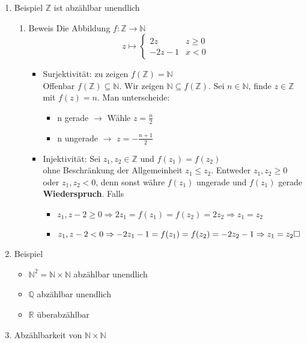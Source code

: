 \documentclass[11pt]{article}
\begin{document}
\begin{enumerate}
\item Beispiel
\label{sec-2-5-1-1}
$\mathbb{Z}$ ist abzählbar unendlich
\begin{enumerate}
\item Beweis
\label{sec-2-5-1-1-1}
Die Abbildung $f:\mathbb{Z}\to\mathbb{N}$
\[z\mapsto \begin{cases} 2z & z\geq 0\\ -2z - 1 & x < 0\end{cases}\]
\begin{itemize}
\item Surjektivität: zu zeigen $f(\mathbb{Z}) = \mathbb{N}$ \\
           Offenbar $f(\mathbb{Z}) \subseteq \mathbb{N}$. Wir zeigen $\mathbb{N} \subseteq f(\mathbb{Z})$. Sei $n\in\mathbb{N}$, finde $z\in\mathbb{Z}$ mit $f(z) = n$.
Man unterscheide:
\begin{itemize}
\item n gerade $\rightarrow$ Wähle $z=\frac{n}{2}$
\item n ungerade $\rightarrow$ $z=-\frac{n + 1}{2}$
\end{itemize}
\item Injektivität: Sei $z_1,z_2 \in\mathbb{Z}$ und $f(z_1) = f(z_2)$ \\
           ohne Beschränkung der Allgemeinheit $z_1 \leq z_2$. Entweder $z_1,z_2 \geq 0$ oder $z_1,z_2 < 0$, denn sonst währe $f(z_1)$ ungerade und $f(z_1)$ gerade \textbf{Wiederspruch}.
Falls
\begin{itemize}
\item $z_1,z-2 \geq 0 \Rightarrow 2z_1 = f(z_1) = f(z_2) = 2z_2 \Rightarrow z_1 = z_2$
\item $z_1,z-2 < 0 \Rightarrow -2z_1 -1 = f(z_1) = f(z_2) = -2z_2-1 \Rightarrow z_1 = z_2 \hfill\square$
\end{itemize}
\end{itemize}
\end{enumerate}
\item Beispiel
\label{sec-2-5-1-2}
\begin{itemize}
\item $\mathbb{N}^2 = \mathbb{N}\times\mathbb{N}$ abzählbar unendlich
\item $\mathbb{Q}$ abzählbar unendlich
\item $\mathbb{R}$ überabzählbar
\end{itemize}
\item Abzählbarkeit von $\mathbb{N}\times\mathbb{N}$
\label{sec-2-5-1-3}

\end{enumerate}
\end{document}
